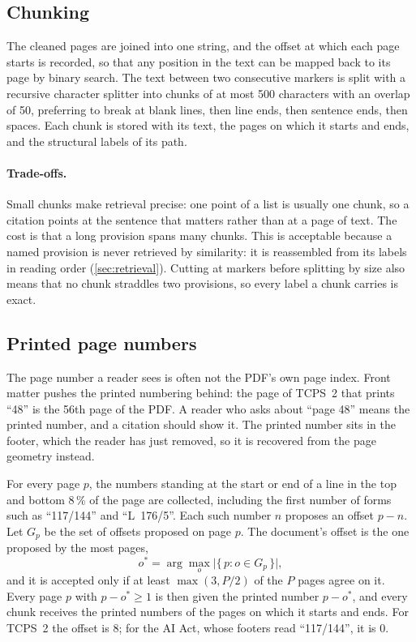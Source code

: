 \subsection{Chunking}

The cleaned pages are joined into one string, and the offset at which each
page starts is recorded, so that any position in the text can be mapped back
to its page by binary search. The text between two consecutive markers is
split with a recursive character splitter into chunks of at most 500
characters with an overlap of 50, preferring to break at blank lines, then
line ends, then sentence ends, then spaces. Each chunk is stored with its
text, the pages on which it starts and ends, and the structural labels of its
path.

\paragraph{Trade-offs.} Small chunks make retrieval precise: one point of a
list is usually one chunk, so a citation points at the sentence that matters
rather than at a page of text. The cost is that a long provision spans many
chunks. This is acceptable because a named provision is never retrieved by
similarity: it is reassembled from its labels in reading order
(\cref{sec:retrieval}). Cutting at markers before splitting by size also means
that no chunk straddles two provisions, so every label a chunk carries is
exact.

\subsection{Printed page numbers}

The page number a reader sees is often not the PDF's own page index. Front
matter pushes the printed numbering behind: the page of TCPS~2 that prints
``48'' is the 56th page of the PDF. A reader who asks about ``page 48'' means
the printed number, and a citation should show it. The printed number sits in
the footer, which the reader has just removed, so it is recovered from the
page geometry instead.

For every page $p$, the numbers standing at the start or end of a line in the
top and bottom 8\,\% of the page are collected, including the first number of
forms such as ``117/144'' and ``L~176/5''. Each such number $n$ proposes an
offset $p - n$. Let $G_p$ be the set of offsets proposed on page $p$. The
document's offset is the one proposed by the most pages,
\begin{equation}
  o^{*} = \arg\max_{o} \bigl|\{\, p : o \in G_p \,\}\bigr|,
\end{equation}
and it is accepted only if at least $\max(3, P/2)$ of the $P$ pages agree on
it. Every page $p$ with $p - o^{*} \geq 1$ is then given the printed number
$p - o^{*}$, and every chunk receives the printed numbers of the pages on
which it starts and ends. For TCPS~2 the offset is 8; for the AI Act, whose
footers read ``117/144'', it is 0.


